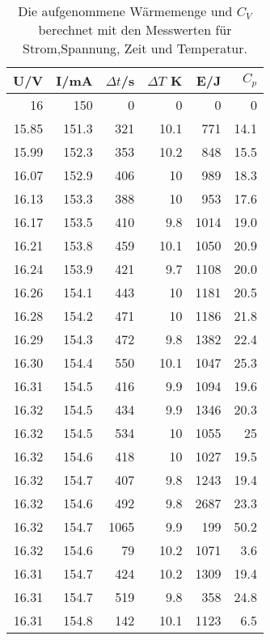 \begin{table}[ht]
    \centering
    \caption{Die aufgenommene Wärmemenge und $C_V$ berechnet mit den Messwerten für Strom,Spannung, Zeit und Temperatur.}
    \begin{tabular}{rrrrrr}
    \toprule
    U/V & I/mA & $\Delta t$/s & $\Delta T$ K & E/J & $C_p$  \\ 
    \midrule
    16   & 150  & 0   & 0   & 0   & 0    \\
    15.85& 151.3& 321 & 10.1& 771 & 14.1 \\
    15.99& 152.3& 353 & 10.2& 848 & 15.5 \\
    16.07& 152.9& 406 & 10  & 989 & 18.3 \\
    16.13& 153.3& 388 & 10  & 953 & 17.6 \\
    16.17& 153.5& 410 & 9.8 & 1014& 19.0 \\
    16.21& 153.8& 459 & 10.1& 1050& 20.9 \\ 
    16.24& 153.9& 421 & 9.7 & 1108& 20.0 \\
    16.26& 154.1& 443 & 10  & 1181& 20.5 \\
    16.28& 154.2& 471 & 10  & 1186& 21.8 \\
    16.29& 154.3& 472 & 9.8 & 1382& 22.4 \\
    16.30& 154.4& 550 & 10.1& 1047& 25.3 \\
    16.31& 154.5& 416 & 9.9 & 1094& 19.6 \\
    16.32& 154.5& 434 & 9.9 & 1346& 20.3 \\
    16.32& 154.5& 534 & 10  & 1055& 25   \\
    16.32& 154.6& 418 & 10  & 1027& 19.5 \\
    16.32& 154.7& 407 & 9.8 & 1243& 19.4 \\
    16.32& 154.6& 492 & 9.8 & 2687& 23.3 \\
    16.32& 154.7& 1065& 9.9 & 199 & 50.2 \\
    16.32& 154.6& 79  & 10.2& 1071& 3.6  \\
    16.31& 154.7& 424 & 10.2& 1309& 19.4 \\
    16.31& 154.7& 519 & 9.8 & 358 & 24.8 \\
    16.31& 154.8& 142 & 10.1& 1123& 6.5  \\
    \bottomrule
    \end{tabular}
    \label{tab:Messwerte}
\end{table}